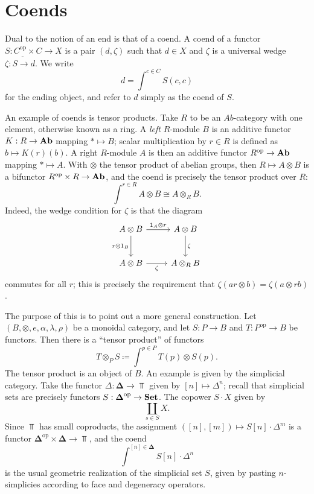 \section{Coends}

\begin{definition}[Coend]\label{dfn:9.5}
	Dual to the notion of an end is that of a coend. A coend of a functor $S : C^{\mathrm{op}} \times C \to X$ is a pair $(d,\zeta)$ such that $d\in X$ and $\zeta$ is a universal wedge $\zeta : S \ddot{\to} d$. We write
	\[
		d= \int^{c\in C} S(c,c)
	\]
	for the ending object, and refer to $d$ simply as the coend of $S$.
\end{definition}

An example of coends is tensor products. Take $R$ to be an $Ab$-category with one element, otherwise known as a ring. A \emph{left} $R$-module $B$ is an additive functor $K : R \to \mathbf{Ab}$ mapping $*\mapsto B$; scalar multiplication by $r\in R$ is defined as $b\mapsto K(r)(b)$. A right $R$-module $A$ is then an additive functor $R^{\mathrm{op}} \to \mathbf{Ab}$ mapping $*\mapsto A$. With $\otimes $ the tensor product of abelian groups, then $R\mapsto A\otimes B$ is a bifunctor $R^{\mathrm{op}} \times R\to \mathbf{Ab}$, and the coend is precisely the tensor product over $R$:
\[
	\int^{r\in R} A\otimes B \cong A\otimes _RB
.\]
Indeed, the wedge condition for $\zeta$ is that the diagram
\[\begin{tikzcd}[row sep = 2.5em, column sep = 2.5em]
A\otimes B \ar[" 1_A \otimes r ", r] \ar[" r \otimes 1_B "', d]  & A\otimes B \ar[" \zeta ", d]  \\
A \otimes B \ar[" \zeta "', r]  & A\otimes _RB
\end{tikzcd}\]
commutes for all $r$; this is precisely the requirement that $\zeta(ar\otimes b)=\zeta(a\otimes rb)$.

The purpose of this is to point out a more general construction. Let $(B,\otimes ,e,\alpha,\lambda,\rho)$ be a monoidal category, and let $S : P \to B$ and $T : P^{\mathrm{op}}  \to B$ be functors. Then there is a ``tensor product'' of functors
\[
	T \otimes _PS \coloneqq \int^{p\in P} T(p) \otimes S(p)
.\]
The tensor product is an object of $B$. An example is given by the simplicial category. Take the functor $\Delta : \boldsymbol{\Delta}  \to \Top $ given by $[n]\mapsto \Delta^n$; recall that simplicial sets are precisely functors $S : \boldsymbol{\Delta} ^{\mathrm{op}}  \to \mathbf{Set} $. The copower $S\cdot X$ given by
\[
	\coprod_{s\in S} X
.\]
Since $\Top$ has small coproducts, the assignment $([n],[m])\mapsto S[n]\cdot \Delta^m$ is a functor $\boldsymbol{\Delta} ^{\mathrm{op}} \times \boldsymbol{\Delta} \to \Top $, and the coend
\[
	\int^{[n]\in \boldsymbol{\Delta} } S[n]\cdot \Delta^n
\]
is the usual geometric realization of the simplicial set $S$, given by pasting $n$-simplicies according to face and degeneracy operators.


